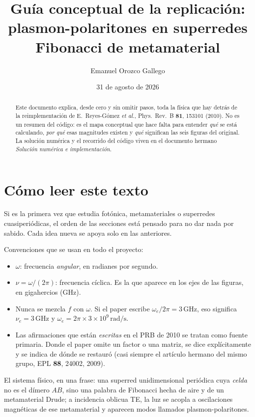 \documentclass[11pt,a4paper]{article}
\title{Guía conceptual de la replicación:\\
plasmon-polaritones en superredes Fibonacci de metamaterial}
\author{Emanuel Orozco Gallego}
\date{31 de agosto de 2026}
\begin{document}
\maketitle

\begin{abstract}
Este documento explica, desde cero y sin omitir pasos, toda la física que hay
detrás de la reimplementación de E.~Reyes-Gómez \textit{et al.},
Phys.\ Rev.\ B \textbf{81}, 153101 (2010).
No es un resumen del código: es el mapa conceptual que hace falta para entender
\emph{qué} se está calculando, \emph{por qué} esas magnitudes existen y
\emph{qué} significan las seis figuras del original.
La solución numérica y el recorrido del código viven en el documento hermano
\textit{Solución numérica e implementación}.
\end{abstract}

\tableofcontents
\newpage

\section{Cómo leer este texto}

Si es la primera vez que estudia fotónica, metamateriales o superredes
cuasiperiódicas, el orden de las secciones está pensado para no dar nada por
sabido. Cada idea nueva se apoya solo en las anteriores.

Convenciones que se usan en todo el proyecto:

\begin{itemize}
\item \(\omega\): frecuencia \emph{angular}, en radianes por segundo.
\item \(\nu=\omega/(2\pi)\): frecuencia cíclica. Es la que aparece en los ejes
de las figuras, en gigahercios (GHz).
\item Nunca se mezcla \(f\) con \(\omega\). Si el paper escribe
\(\omega_e/2\pi=3\,\mathrm{GHz}\), eso significa
\(\nu_e=3\,\mathrm{GHz}\) y \(\omega_e=2\pi\times 3\times 10^9\,\mathrm{rad/s}\).
\item Las afirmaciones que están \emph{escritas} en el PRB de 2010 se tratan
como fuente primaria. Donde el paper omite un factor o una matriz, se dice
explícitamente y se indica de dónde se restauró (casi siempre el artículo
hermano del mismo grupo, EPL \textbf{88}, 24002, 2009).
\end{itemize}

El sistema físico, en una frase: una superred unidimensional periódica cuya
\emph{celda} no es el dímero \(AB\), sino una palabra de Fibonacci hecha de
aire y de un metamaterial Drude; a incidencia oblicua TE, la luz se acopla a
oscilaciones magnéticas de ese metamaterial y aparecen modos llamados
plasmon-polaritones.
\end{document}
